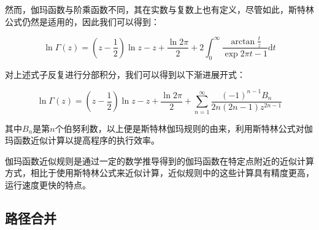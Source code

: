 \begin{itemize}
  然而，伽玛函数与阶乘函数不同，其在实数与复数上也有定义，尽管如此，斯特林公式仍然是适用的，因此我们可以得到：
  
  \begin{equation*}
    \ln \Gamma(z) = (z-\frac{1}{2})\ln z - z + \frac{\ln 2 \pi}{2} + 2 \int_{0}^{\infty}\frac{\arctan \frac{t}{z}}{\exp{2\pi t}-1} \mathrm{d} t
  \end{equation*}

  对上述式子反复进行分部积分，我们可以得到以下渐进展开式：

  \begin{equation*}
    \ln \Gamma(z) = (z-\frac{1}{2})\ln z - z + \frac{\ln 2 \pi}{2} + \sum_{n=1}^{\infty}\frac{(-1)^{n-1}B_n}{2n(2n-1)z^{2n-1}}
  \end{equation*}

  其中$B_n$是第$n$个伯努利数，以上便是斯特林伽玛规则的由来，利用斯特林公式对伽玛函数近似计算以提高程序的执行效率。

  伽玛函数近似规则是通过一定的数学推导得到的伽玛函数在特定点附近的近似计算方式，相比于使用斯特林公式来近似计算，近似规则中的这些计算具有精度更高，运行速度更快的特点。

\end{itemize}




\subsection{路径合并}

